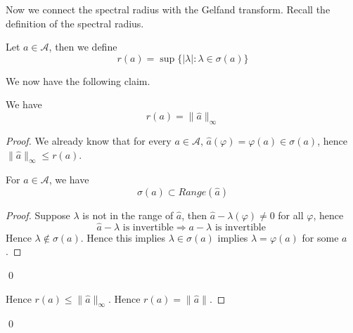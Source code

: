 Now we connect the spectral radius with the Gelfand transform. Recall the definition of the spectral radius.
\begin{definition}
    Let $a\in\mathcal{A}$, then we define
    \begin{equation*}
        r(a)=\sup\{|\lambda|: \lambda\in\sigma(a)\}
    \end{equation*}
\end{definition}
We now have the following claim.
\begin{proposition}
    We have
    \begin{equation*}
        r(a)=\|\widehat{a}\|_\infty
    \end{equation*}
\end{proposition}
\begin{proof}
    We already know that for every $a\in\mathcal{A}$, $\widehat{a}(\varphi)=\varphi(a)\in\sigma(a)$, hence $\|\widehat{a}\|_\infty\leq r(a)$.
    \begin{lemma}
        For $a\in\mathcal{A}$, we have
        \begin{equation*}
            \sigma(a)\subset Range(\widehat{a})
        \end{equation*}
    \end{lemma}
    \begin{proof}
        Suppose $\lambda$ is not in the range of $\widehat{a}$, then $\widehat{a}-\lambda(\varphi)\neq 0$ for all $\varphi$, hence
        \begin{equation*}
            \widehat{a}-\lambda \text{ is invertible} \Rightarrow a-\lambda \text{ is invertible }
        \end{equation*}
        Hence $\lambda\not\in\sigma(a)$. Hence this implies $\lambda\in\sigma(a)$ implies $\lambda=\varphi(a)$ for some $a$.
    \end{proof}
    \qed

    Hence $r(a)\leq\|\widehat{a}\|_\infty$. Hence $r(a)=\|\widehat{a}\|$.
\end{proof}
\qed

